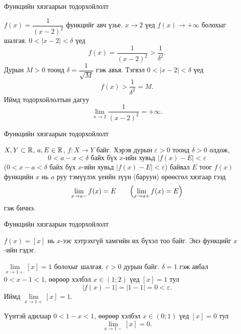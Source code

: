 \begin{frame}[allowframebreaks]{Функцийн хязгаарын тодорхойлолт}
\begin{example}
$f(x)=\dfrac{1}{(x-2)^2}$ функцийг авч үзье. $x\to 2$ үед $f(x)\to+\infty$ болохыг шалгая.
$0<|x-2|<\delta$ үед
\[
f(x)=\frac{1}{(x-2)^2}>\frac{1}{\delta^2}.
\]
Дурын $M>0$ тоонд $\delta=\dfrac{1}{\sqrt{M}}$ гэж авъя. Тэгвэл $0<|x-2|<\delta$ үед
\[
f(x)>\frac{1}{\delta^2}=M.
\]
Иймд тодорхойлолтын дагуу
\[
\lim_{x\to 2}\frac{1}{(x-2)^2}=+\infty.
\]
\end{example}
\end{frame}

\begin{frame}[allowframebreaks]{Функцийн хязгаарын тодорхойлолт}
\begin{definition} $X, Y\subset\mathbb{R}$, $a, E\in\mathbb{R}$, $f:X\to Y$ байг.
Хэрэв дурын $\varepsilon>0$ тоонд $\delta>0$ олдож,
$$0<a-x<\delta \text{ байх бүх } x \text{-ийн хувьд } |f(x)-E|<\varepsilon$$
($0<x-a<\delta$ байх бүх $x$-ийн хувьд $|f(x)-E|<\varepsilon$)
байвал $E$ тоог $f(x)$ функцийн $x$ нь $a$ руу тэмүүлэх үеийн зүүн (баруун) өрөөсгөл хязгаар гээд
$$\lim\limits_{x\to a-}f(x)=E \qquad \Bigl(\lim\limits_{x\to a+}f(x)=E\Bigr)$$
гэж бичнэ.
\end{definition}
\end{frame}

\begin{frame}[allowframebreaks]{Функцийн хязгаарын тодорхойлолт}
\begin{example}\label{Onesidedlimit}
$f(x)=[x]$ нь $x$-ээс хэтрэхгүй хамгийн их бүхэл тоо байг. Энэ функцийг $x$-ийн  гэдэг.

$\lim\limits_{x\to 1+}[x]=1$ болохыг шалгая. $\varepsilon>0$ дурын байг. $\delta=1$ гэж авбал $0<x-1<1$, өөрөөр хэлбэл
$x\in(1;2)$ үед $[x]=1$ тул
$$|f(x)-1|=|1-1|=0<\varepsilon.$$
Иймд $\lim\limits_{x\to 1+}[x]=1$.

Үүнтэй адилаар $0<1-x<1$, өөрөөр хэлбэл $x\in(0;1)$ үед $[x]=0$ тул
$$\lim\limits_{x\to 1-}[x]=0.$$
\end{example}
\end{frame}

